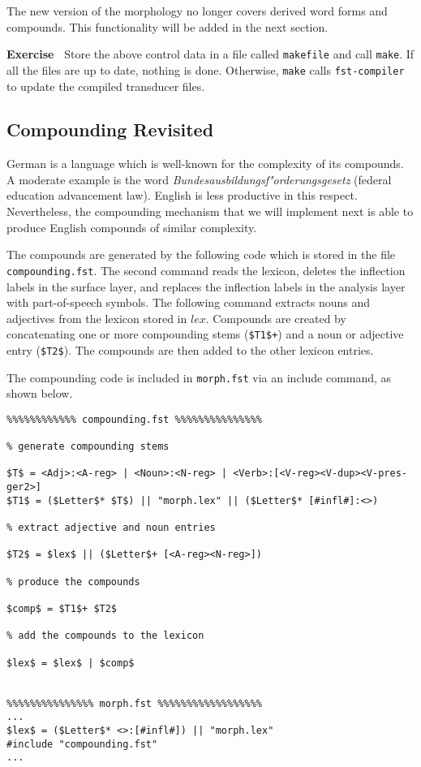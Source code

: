 \documentclass[11pt]{article}
\newenvironment{exercise}{

  \hrulefill\nopagebreak

  \textbf{Exercise~}}
{

  \nopagebreak\hrulefill\vspace{0.2cm}

}
\begin{document}
The new version of the morphology no longer covers derived word forms
and compounds. This functionality will be added in the next section.

\begin{exercise}
  Store the above control data in a file called \texttt{makefile} and
  call \texttt{make}. If all the files are up to date, nothing is
  done. Otherwise, \texttt{make} calls \texttt{fst-compiler} to update
  the compiled transducer files.
\end{exercise}


\subsection{Compounding Revisited}

German is a language which is well-known for the complexity of its
compounds. A moderate example is the word
\emph{Bundesausbildungsf"orderungsgesetz} (federal education
advancement law). English is less productive in this respect.
Nevertheless, the compounding mechanism that we will implement next is
able to produce English compounds of similar complexity.

The compounds are generated by the following code which is stored in
the file \texttt{compounding.fst}. The second command reads the
lexicon, deletes the inflection labels in the surface layer, and
replaces the inflection labels in the analysis layer with
part-of-speech symbols. The following command extracts nouns and
adjectives from the lexicon stored in \texttt{$lex$}. Compounds are
created by concatenating one or more compounding stems
(\texttt{\$T1\$+}) and a noun or adjective entry (\texttt{\$T2\$}).
The compounds are then added to the other lexicon entries.

The compounding code is included in \texttt{morph.fst} via an include
command, as shown below.

\begin{verbatim}
%%%%%%%%%%%% compounding.fst %%%%%%%%%%%%%%%

% generate compounding stems

$T$ = <Adj>:<A-reg> | <Noun>:<N-reg> | <Verb>:[<V-reg><V-dup><V-pres-ger2>]
$T1$ = ($Letter$* $T$) || "morph.lex" || ($Letter$* [#infl#]:<>)

% extract adjective and noun entries

$T2$ = $lex$ || ($Letter$+ [<A-reg><N-reg>])

% produce the compounds

$comp$ = $T1$+ $T2$

% add the compounds to the lexicon

$lex$ = $lex$ | $comp$


%%%%%%%%%%%%%%% morph.fst %%%%%%%%%%%%%%%%%%
...
$lex$ = ($Letter$* <>:[#infl#]) || "morph.lex"
#include "compounding.fst"
...
\end{verbatim}
\end{document}
